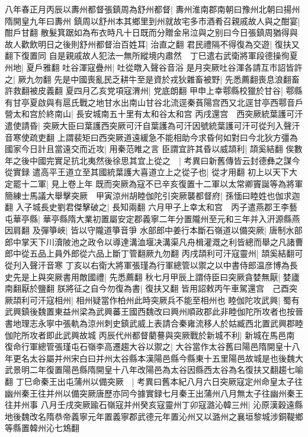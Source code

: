 八年春正月丙辰以夀州都督張鎮周為舒州都督|{
	夀州淮南郡南朝曰豫州北朝曰揚州隋開皇九年曰夀州}
鎮周以舒州本其鄉里到州就故宅多市酒肴召親戚故人與之酣宴|{
	酣戶甘翻}
散髮箕踞如為布衣時凡十日既而分贈金帛泣與之别曰今日張鎮周猶得與故人歡飲明日之後則舒州都督治百姓耳|{
	治直之翻}
君民禮隔不得復為交遊|{
	復扶又翻下復置同}
自是親戚故人犯法一無所縱境内肅然　丁巳遣右武衛將軍段德操徇夏州地|{
	夏戶雅翻}
吐谷渾寇疊州|{
	吐從暾入聲谷音浴}
是月突厥吐谷渾各請互市詔皆許之|{
	厥九勿翻}
先是中國喪亂民乏耕牛至是資於戎狄雜畜被野|{
	先悉薦翻喪息浪翻畜許救翻被皮義翻}
夏四月乙亥党項寇渭州|{
	党底朗翻}
甲申上幸鄠縣校獵於甘谷|{
	鄠縣有甘亭夏啟與有扈氏戰之地甘水出南山甘谷北流逕秦萯陽宫西又北逕甘亭西鄠音戶}
營太和宫於終南山|{
	長安城南五十里有太和谷太和宫}
丙戌還宫　西突厥統葉護可汗遣使請昏|{
	突厥大臣曰葉護西突厥可汗自葉護為可汗因號統葉護可汗可從刋入聲汗音寒使疏吏翻}
上謂裴矩曰西突厥道遠緩急不能相助今求昏何如對曰今北狄方彊為國家今日計且當遠交而近攻|{
	用秦范睢之言}
臣謂宜許其昏以威頡利|{
	頡奚結翻}
俟數年之後中國完實足抗北夷然後徐思其宜上從之　|{
	考異曰新舊傳皆云封德彝之謀今從實録}
遣高平王道立至其國統葉護大喜道立上之從子也|{
	從才用翻}
初上以天下大定罷十二軍|{
	見上卷上年}
既而突厥為寇不已辛亥復置十二軍以太常卿竇誕等為將軍簡練士馬議大舉擊突厥　甲寅涼州胡睦伽陀引突厥襲都督府|{
	孫愐曰睦姓也伽求迦翻}
入子城長史劉君傑擊破之|{
	長知兩翻}
六月甲子上幸太和宫　丙子遣燕郡王李藝屯華亭縣|{
	華亭縣隋大業初置屬安定郡義寧二年分置隴州至元和三年并入汧源縣燕因肩翻}
及彈箏峽|{
	皆以守隴道箏音爭}
水部郎中姜行本斷石嶺道以備突厥|{
	唐制水部郎中掌天下川瀆陂池之政令以導達溝洫堰决溝渠凡舟楫灌溉之利皆總而舉之凡諸曹郎中從五品上員外郎從六品上斷丁管翻厥九勿翻}
丙戌頡利可汗寇靈州|{
	頡奚結翻可從刋入聲汗音寒}
丁亥以右衛大將軍張瑾為行軍總管以禦之以中書侍郎温彦博為長史先是上與突厥書用敵國禮|{
	先悉薦翻}
秋七月甲辰上謂侍臣曰突厥貪婪無厭|{
	婪廬南翻厭於鹽翻}
朕將征之自今勿復為書|{
	復扶又翻}
皆用詔敕丙午車駕還宫　己酉突厥頡利可汗寇相州|{
	相州疑當作柏州此時突厥兵不能至相州也}
睦伽陀攻武興|{
	蜀有武興鎮後魏置東益州梁為武興蕃王國西魏改曰興州順政郡此非睦伽陀所攻者也按晉書地理志永寧中張軌為涼州刺史鎮武威上表請合秦雍流移人於姑臧西北置武興郡睦伽陀所攻者即此武興故城}
丙辰代州都督藺謩與突厥戰於新城不利|{
	新城在馬邑南}
復命行軍總管張瑾屯石嶺李高遷趨大谷以禦之|{
	大谷當作太谷舊曰陽邑隋開皇十八年更名太谷屬并州宋白曰并州太谷縣本漢陽邑縣今縣東十五里陽邑故城是也後魏大武景明二年復置陽邑縣隋開皇十八年改陽邑為太谷因縣西太谷為名復扶又翻趨七喻翻}
丁巳命秦王出屯蒲州以備突厥　|{
	考異曰舊本紀八月六日突厥寇定州命皇太子往幽州秦王往并州以備突厥唐歷亦同今據實録七月秦王出蒲州八月無太子往幽州秦王往并州事}
八月壬戌突厥踰石嶺寇并州癸亥寇靈州丁卯寇潞沁韓三州|{
	沁原漢穀遠縣地後魏改名隋恭帝義寧元年置義寧郡武德元年置沁州又以潞州之襄垣黎城涉銅鞮鄉等縣置韓州沁七鴆翻}

